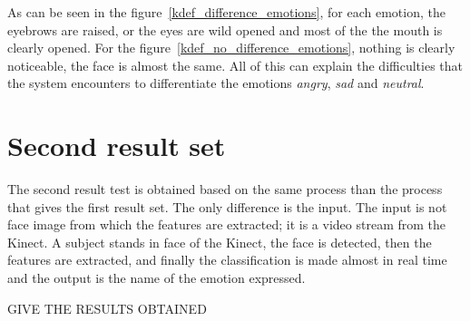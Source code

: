 \noindent As can be seen in the figure~\ref{kdef_difference_emotions}, for each emotion, the eyebrows are raised, or the eyes are wild opened and most of the the mouth is clearly opened. For the figure~\ref{kdef_no_difference_emotions}, nothing is clearly noticeable, the face is almost the same. All of this can explain the difficulties that the system encounters to differentiate the emotions \textit{angry}, \textit{sad} and \textit{neutral}.
\newline

\section{Second result set}

\vspace{\baselineskip}
\noindent The second result test is obtained based on the same process than the process that gives the first result set. The only difference is the input. The input is not face image from which the features are extracted; it is a video stream from the Kinect. A subject stands in face of the Kinect, the face is detected, then the features are extracted, and finally the classification is made almost in real time and the output is the name of the emotion expressed.
\newline

\noindent GIVE THE RESULTS OBTAINED
\newline

